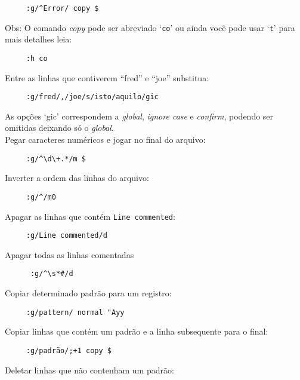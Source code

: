 \begin{verbatim}
     :g/^Error/ copy $
\end{verbatim}

Obs: O comando {\em copy} pode ser abreviado `{\tt co}' ou ainda você pode usar `{\tt t}'
para mais detalhes leia:

\begin{verbatim}
     :h co
\end{verbatim}

Entre as linhas que contiverem ``fred'' e ``joe'' substitua:

\begin{verbatim}
     :g/fred/,/joe/s/isto/aquilo/gic
\end{verbatim}

As opções `gic' correspondem a {\em global}, {\em ignore case} e {\em
confirm}, podendo ser omitidas deixando só o {\em global}. \\


Pegar caracteres numéricos e jogar no final do arquivo:

\begin{verbatim}
     :g/^\d\+.*/m $
\end{verbatim}

Inverter a ordem das linhas do arquivo:

\begin{verbatim}
     :g/^/m0
\end{verbatim}

Apagar as linhas que contém {\tt Line commented}:

\begin{verbatim}
     :g/Line commented/d
\end{verbatim}

Apagar todas as linhas comentadas

\begin{verbatim}
      :g/^\s*#/d
\end{verbatim}

Copiar determinado padrão para um registro:

\begin{verbatim}
     :g/pattern/ normal "Ayy
\end{verbatim}

Copiar linhas que contém um padrão e a linha subsequente para o final:

\begin{verbatim}
     :g/padrão/;+1 copy $
\end{verbatim}

Deletar linhas que não contenham um padrão:

